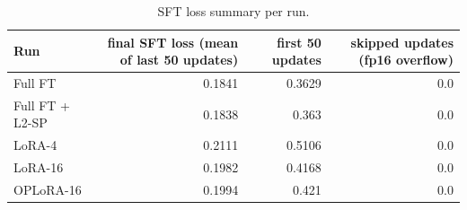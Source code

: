 \begin{table}[t]
\centering\small
\begin{tabular}{lrrr}
\toprule
Run & final SFT loss (mean of last 50 updates) & first 50 updates & skipped updates (fp16 overflow) \\
\midrule
Full FT & 0.1841 & 0.3629 & 0.0 \\
Full FT + L2-SP & 0.1838 & 0.363 & 0.0 \\
LoRA-4 & 0.2111 & 0.5106 & 0.0 \\
LoRA-16 & 0.1982 & 0.4168 & 0.0 \\
OPLoRA-16 & 0.1994 & 0.421 & 0.0 \\
\bottomrule
\end{tabular}
\caption{SFT loss summary per run.}
\label{tab:task1_loss_summary}
\end{table}
